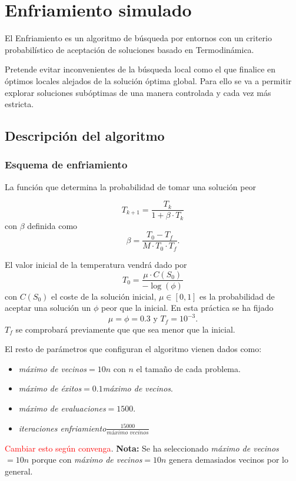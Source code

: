 
\section{Enfriamiento simulado}

El Enfriamiento es un algoritmo de búsqueda por entornos con un criterio probabilístico de aceptación de soluciones basado en Termodinámica. 

Pretende evitar inconvenientes de la búsqueda local 
como el que finalice en óptimos locales
alejados de la solución óptima global. Para ello se 
va a permitir explorar soluciones subóptimas de una manera
controlada y cada vez más estricta. 

\subsection{Descripción del algoritmo} 

\subsubsection{Esquema de enfriamiento} 
La función que determina la probabilidad de tomar una solución peor 

\begin{equation*}
    T_{k+1} = \frac{T_k}{1 + \beta \cdot T_k}
\end{equation*}
con $\beta$ definida como 
\begin{equation*}
    \beta = \frac{T_0 - T_f}{M \cdot T_0 \cdot T_f}. 
\end{equation*}

El valor inicial de la temperatura vendrá dado por 
\begin{equation*}
    T_0 = \frac{\mu \cdot C(S_0)}{- \log (\phi)}
\end{equation*}
con $C(S_0)$ el coste de la solución inicial,
$\mu  \in [0,1]$ es la probabilidad de aceptar una solución un $\phi$ peor que la inicial. 
En esta práctica se ha fijado 
\begin{equation*}
    \mu = \phi = 0.3 \text{  y } T_f = 10^{-3}.
\end{equation*}
$T_f$ se comprobará previamente que que sea menor que la inicial. 

El resto de parámetros que configuran el algoritmo vienen
dados como: 
\begin{itemize}
    \item \textit{máximo de vecinos}$= 10 n$ con $n$ el tamaño de cada problema. 
    \item \textit{máximo de éxitos}$= 0.1$\textit{máximo de vecinos}.
    \item \textit{máximo de evaluaciones}$=1500$.
    \item \textit{iteraciones enfriamiento}$\frac{15000}{\textit{máximo vecinos}}$ 
\end{itemize}
\textcolor{red}{Cambiar esto según convenga}.
\textbf{Nota: }Se ha seleccionado \textit{máximo de vecinos}$= 10 n$ porque con \textit{máximo de vecinos}$= 10 n$ genera demasiados vecinos por lo general. 

